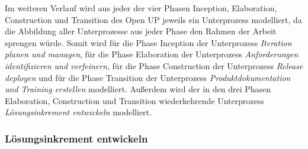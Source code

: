 Im weiteren Verlauf wird aus jeder der vier Phasen Inception, Elaboration, Construction und Transition des Open UP jeweils ein Unterprozess modelliert, da die Abbildung aller Unterprozesse aus jeder Phase den Rahmen der Arbeit sprengen würde. \newline
Somit wird für die Phase Inception der Unterprozess \textit{Iteration planen und managen}, für die Phase Elaboration der Unterprozess \textit{Anforderungen identifizieren und verfeinern}, für die Phase Construction der Unterprozess \textit{Release deployen} und für die Phase Transition der Unterprozess \textit{Produktdokumentation und Training erstellen} modelliert. Außerdem wird der in den drei Phasen Elaboration, Construction und Transition wiederkehrende Unterprozess \textit{Lösungsinkrement entwickeln} modelliert.

\subsubsection{Lösungsinkrement entwickeln}

